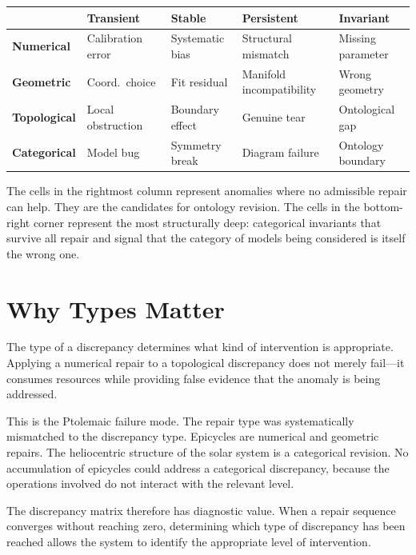 \documentclass[12pt,oneside]{book}
\theoremstyle{plain}
\theoremstyle{definition}
\theoremstyle{remark}
\newcommand{\1}{\mathbf{1}}
\begin{document}
\begin{center}
\renewcommand{\arraystretch}{1.2}
\begin{tabular}{lllll}
\toprule
 & \textbf{Transient} & \textbf{Stable} & \textbf{Persistent} & \textbf{Invariant} \\
\midrule
\textbf{Numerical}   & Calibration error  & Systematic bias  & Structural mismatch        & Missing parameter  \\
\textbf{Geometric}   & Coord.\ choice     & Fit residual     & Manifold incompatibility   & Wrong geometry     \\
\textbf{Topological} & Local obstruction  & Boundary effect  & Genuine tear               & Ontological gap    \\
\textbf{Categorical} & Model bug          & Symmetry break   & Diagram failure            & Ontology boundary  \\
\bottomrule
\end{tabular}
\end{center}

The cells in the rightmost column represent anomalies where no admissible repair can help. They are the candidates for ontology revision. The cells in the bottom-right corner represent the most structurally deep: categorical invariants that survive all repair and signal that the category of models being considered is itself the wrong one.

\section{Why Types Matter}

The type of a discrepancy determines what kind of intervention is appropriate. Applying a numerical repair to a topological discrepancy does not merely fail---it consumes resources while providing false evidence that the anomaly is being addressed.

This is the Ptolemaic failure mode. The repair type was systematically mismatched to the discrepancy type. Epicycles are numerical and geometric repairs. The heliocentric structure of the solar system is a categorical revision. No accumulation of epicycles could address a categorical discrepancy, because the operations involved do not interact with the relevant level.

The discrepancy matrix therefore has diagnostic value. When a repair sequence converges without reaching zero, determining which type of discrepancy has been reached allows the system to identify the appropriate level of intervention.
\end{document}
